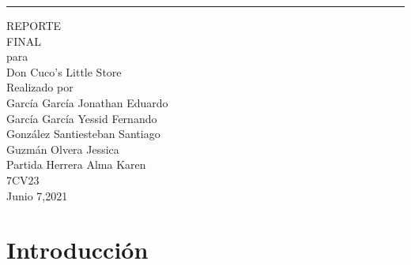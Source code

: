 \documentclass[a4paper,DIV=12]{scrreprt}
\date{}
\begin{document}
\renewcommand\contentsname{Contenido}

\begin{flushright}
    \rule{16cm}{5pt}\vskip1cm
    \begin{bfseries}
        \Huge{REPORTE \\ FINAL}\\
        \vspace{1.9cm}
        para\\
        \vspace{1.9cm}
        Don Cuco's Little Store\\
    
        \LARGE{ }
        \vspace{1.9cm}
		Realizado por \\ 
		
		García García Jonathan Eduardo\\
		García García Yessid Fernando\\
		González Santiesteban Santiago\\
		Guzmán Olvera Jessica\\
        Partida Herrera Alma Karen \\
        
		
		\vspace{1.0cm}
        7CV23 \\
        \vspace{0.5cm}
        Junio 7,2021
        \\
    \end{bfseries}
\end{flushright}

\tableofcontents





\chapter{Introducción}
\end{document}
